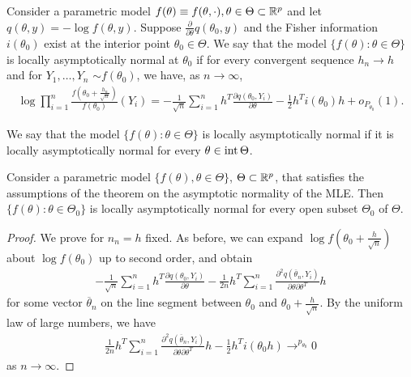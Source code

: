 \begin{defn}
  \label{sec:local-asympt-norm-1}
  Consider a parametric model $f(\theta) \equiv f(\theta, \cdot),
  \theta \in \Theta \subset \mathbb{R}^{p}$ and let $q(\theta, y) = - \log
  f(\theta, y)$.  Suppose $\frac{\partial}{\partial \theta}
  q(\theta_{0}, y)$ and the Fisher information $i(\theta_{0})$ exist
  at the interior point $\theta_{0} \in \Theta$.  We say that the
  model $\{ f(\theta): \theta \in \Theta \} $ is locally
  asymptotically normal at $\theta_{0}$ if for every convergent
  sequence $h_{n} \rightarrow h$ and for $Y_{1}, \dots, Y_{n}$ \iid
  $\sim f(\theta_{0})$, we have, as $n \rightarrow \infty$,
  \begin{align}
    \label{eq:28}
    \log \prod_{i=1}^{n} \frac{f(\theta_{0} +
      \frac{h_{n}}{\sqrt{n}})}{f(\theta_{0})}(Y_{i}) = -
    \frac{1}{\sqrt{n}} \sum_{i=1}^{n} h^{T} \frac{\partial
      q(\theta_{0}, Y_{i})}{\partial \theta} - \frac{1}{2} h^{T}
    i(\theta_{0}) h + o_{P_{\theta_{0}}}(1).
  \end{align}

  We say that the model $\{ f(\theta): \theta \in \Theta \} $ is
  locally asymptotically normal if it is locally asymptotically normal
  for every $\theta \in \operatorname*{int} \Theta$.
\end{defn}

\begin{thm}
  Consider a parametric model $\{ f(\theta), \theta \in \Theta \} $,
  $\Theta \subset \mathbb{R}^{p}$, that satisfies the assumptions of the
  theorem on the asymptotic normality of the MLE.  Then $\{ f(\theta):
\theta \in \Theta_{0} \} $ is locally asymptotically normal for every
open subset $\Theta_{0}$ of $\Theta$.
\end{thm}

\begin{proof}
  We prove for $n_{n} = h$ fixed.  As before, we can expand $\log
  f(\theta_{0} + \frac{h}{\sqrt{n}})$ about $\log f(\theta_{0})$ up to
  second order, and obtain
  \begin{align}
    \label{eq:10}
    -\frac{1}{\sqrt{n}} \sum_{i=1}^{n} h^{T} \frac{\partial
      q(\theta_{0}, Y_{i})}{\partial \theta}  - \frac{1}{2n} h^{T}
    \sum_{i=1}^{n} \frac{\partial^{2} q(\overline \theta_{n},
      Y_{i})}{\partial \theta \partial \theta^{T}} h
  \end{align} for some vector $\overline \theta_{n}$ on the line
  segment between $\theta_{0}$ and $\theta_{0} + \frac{h}{\sqrt{n}}$.
  By the uniform law of large numbers, we have
  \begin{align}
    \label{eq:11}
    \frac{1}{2n} h^{T} \sum_{i=1}^{n} \frac{\partial^{2} q(\overline
      \theta_{n}, Y_{i})}{\partial \theta \partial \theta^{T}}  h -
    \frac{1}{2} h^{T} i(\theta_{0} h) \rightarrow^{p_{\theta_{0}}} 0
  \end{align} as $n \rightarrow \infty$.
\end{proof}

